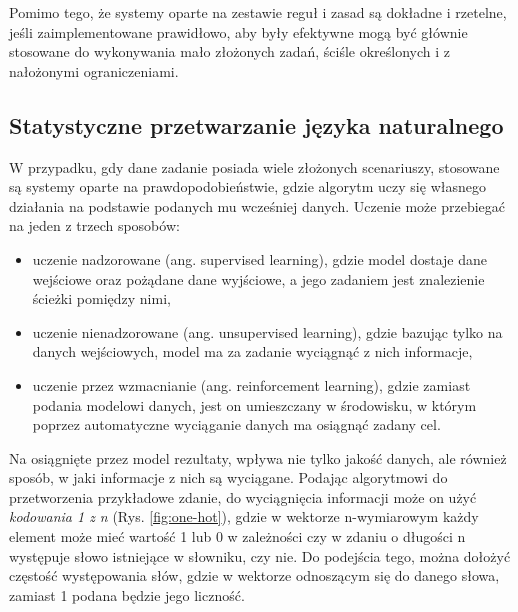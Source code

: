 Pomimo tego, że systemy oparte na zestawie reguł i zasad są dokładne i rzetelne, jeśli zaimplementowane prawidłowo, aby były efektywne mogą być głównie stosowane do wykonywania mało złożonych zadań, ściśle określonych i z nałożonymi ograniczeniami. 


\subsection{Statystyczne przetwarzanie języka naturalnego}
\label{subsec:statistyc}

W przypadku, gdy dane zadanie posiada wiele złożonych scenariuszy, stosowane są systemy oparte na prawdopodobieństwie, gdzie algorytm uczy się własnego działania na podstawie podanych mu wcześniej danych. Uczenie może przebiegać na jeden z trzech sposobów: 
\begin{itemize}
    \item uczenie nadzorowane (ang. supervised learning), gdzie model dostaje dane wejściowe oraz pożądane dane wyjściowe, a jego zadaniem jest znalezienie ścieżki pomiędzy nimi,
    \item uczenie nienadzorowane (ang. unsupervised learning), gdzie bazując tylko na danych wejściowych, model ma za zadanie wyciągnąć z nich informacje, 
    \item uczenie przez wzmacnianie (ang. reinforcement learning), gdzie zamiast podania modelowi danych, jest on umieszczany w środowisku, w którym poprzez automatyczne wyciąganie danych ma osiągnąć zadany cel. 
\end{itemize}

Na osiągnięte przez model rezultaty, wpływa nie tylko jakość danych, ale również sposób, w jaki informacje z nich są wyciągane. Podając algorytmowi do przetworzenia przykładowe zdanie, do wyciągnięcia informacji może on użyć \textit{kodowania 1 z n} (Rys. \ref{fig:one-hot}), gdzie w wektorze n-wymiarowym każdy element może mieć wartość 1 lub 0 w zależności czy w zdaniu o długości n występuje słowo istniejące w słowniku, czy nie. Do podejścia tego, można dołożyć częstość występowania słów, gdzie w wektorze odnoszącym się do danego słowa, zamiast 1 podana będzie jego liczność. 

